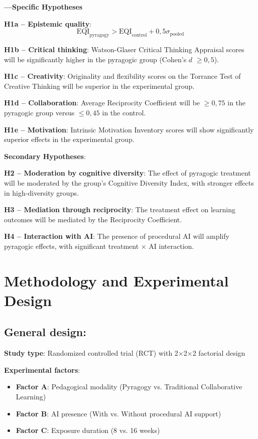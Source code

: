 \textbf{---Specific Hypotheses}

\textbf{H1a -- Epistemic quality}: 
\begin{equation}
\text{EQI}_{\text{pyragogy}} > \text{EQI}_{\text{control}} + 0{,}5 \sigma_{\text{pooled}}
\label{eq:h1a}
\end{equation}

\textbf{H1b -- Critical thinking}: Watson-Glaser Critical Thinking Appraisal scores will be significantly higher in the pyragogic group (Cohen's $d$ $\geq 0{,}5$).

\textbf{H1c -- Creativity}: Originality and flexibility scores on the Torrance Test of Creative Thinking will be superior in the experimental group.

\textbf{H1d -- Collaboration}: Average Reciprocity Coefficient will be $\geq 0{,}75$ in the pyragogic group versus $\leq 0{,}45$ in the control.

\textbf{H1e -- Motivation}: Intrinsic Motivation Inventory scores will show significantly superior effects in the experimental group.

\textbf{Secondary Hypotheses}:

\textbf{H2 -- Moderation by cognitive diversity}: The effect of pyragogic treatment will be moderated by the group's Cognitive Diversity Index, with stronger effects in high-diversity groups.

\textbf{H3 -- Mediation through reciprocity}: The treatment effect on learning outcomes will be mediated by the Reciprocity Coefficient.

\textbf{H4 -- Interaction with AI}: The presence of procedural AI will amplify pyragogic effects, with significant treatment × AI interaction.

\section{Methodology and Experimental Design}
\subsection*{General design:}

\textbf{Study type}: Randomized controlled trial (RCT) with 2×2×2 factorial design

\textbf{Experimental factors}:
\begin{itemize}
    \item \textbf{Factor A}: Pedagogical modality (Pyragogy vs. Traditional Collaborative Learning)
    \item \textbf{Factor B}: AI presence (With vs. Without procedural AI support)
    \item \textbf{Factor C}: Exposure duration (8 vs. 16 weeks)
\end{itemize}


